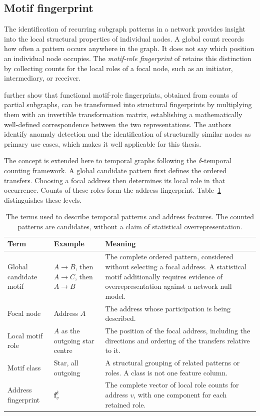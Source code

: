 \subsection{Motif fingerprint}
The identification of recurring subgraph patterns in a network provides insight
into the local structural properties of individual nodes. A global count records
how often a pattern occurs anywhere in the graph. It does not say which position
an individual node occupies. The \emph{motif-role fingerprint} of
\citet{McDonnell2014} retains this distinction by collecting counts for the local
roles of a focal node, such as an initiator, intermediary, or receiver.

\citet{McDonnell2014} further show that functional motif-role fingerprints, obtained from counts of partial subgraphs, can be transformed into structural fingerprints by multiplying them with an invertible transformation matrix, establishing a mathematically well-defined correspondence between the two representations. The authors identify anomaly detection and the identification of structurally similar nodes as primary use cases, which makes it well applicable for this thesis.

The concept is extended here to temporal graphs following the
$\delta$-temporal counting framework. A global candidate pattern first defines
the ordered transfers. Choosing a focal address then determines its local role
in that occurrence. Counts of these roles form the address fingerprint.
Table~\ref{tab:motif_terminology} distinguishes these levels.

\begin{table}[htbp]
\centering
\small
\caption{The terms used to describe temporal patterns and address features.
The counted patterns are candidates, without a claim of statistical
overrepresentation.}
\label{tab:motif_terminology}
\begin{tabular}{@{}p{2.9cm} p{3.6cm} p{6.1cm}@{}}
\toprule
\textbf{Term} & \textbf{Example} & \textbf{Meaning} \\
\midrule
Global candidate motif &
$A \to B$, then $A \to C$, then $A \to B$ &
The complete ordered pattern, considered without selecting a focal address.
A statistical motif additionally requires evidence of overrepresentation
against a network null model. \\[5pt]
Focal node &
Address $A$ &
The address whose participation is being described. \\[5pt]
Local motif role &
$A$ as the outgoing star centre &
The position of the focal address, including the directions and ordering of
the transfers relative to it. \\[5pt]
Motif class &
Star, all outgoing &
A structural grouping of related patterns or roles. A class is not one
feature column. \\[5pt]
Address fingerprint &
$\mathbf{f}_v^\delta$ &
The complete vector of local role counts for address $v$, with one component
for each retained role. \\
\bottomrule
\end{tabular}
\end{table}

